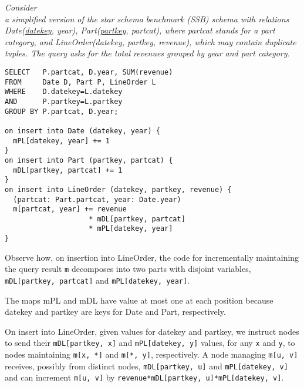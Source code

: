 \begin{example}\em
\label{ex:ssb}
Con\-sider \\ a simplified version of the star schema
benchmark (SSB) schema with relations Date(\underline{datekey}, year),
Part(\underline{partkey}, partcat), where partcat stands for a part category,
and LineOrder(datekey, partkey, revenue), which may contain duplicate tuples.
The query asks for the total revenues grouped by year and part category.

\begin{verbatim}
SELECT   P.partcat, D.year, SUM(revenue)
FROM     Date D, Part P, LineOrder L
WHERE    D.datekey=L.datekey
AND      P.partkey=L.partkey
GROUP BY P.partcat, D.year;

on insert into Date (datekey, year) {
  mPL[datekey, year] += 1
}
on insert into Part (partkey, partcat) {
  mDL[partkey, partcat] += 1
}
on insert into LineOrder (datekey, partkey, revenue) {
  (partcat: Part.partcat, year: Date.year)
  m[partcat, year] += revenue
                    * mDL[partkey, partcat]
                    * mPL[datekey, year]
}
\end{verbatim}

Observe how, on insertion into LineOrder, the code for incrementally
maintaining the query result {\tt m} decomposes into
two parts with disjoint variables, 
{\tt mDL[partkey, partcat]} and {\tt mPL[datekey, year]}.

The maps mPL and mDL have value at most
one at each position because datekey and partkey are keys for Date and Part,
respectively.

On insert into LineOrder, given values for
datekey and partkey, we instruct nodes
to send their {\tt mDL[partkey, x]} and {\tt mPL[datekey, y]} values,
for any {\tt x} and {\tt y},
to nodes maintaining {\tt m[x, *]} and {\tt m[*, y]}, respectively.
A node managing {\tt m[u, v]} receives, possibly from distinct nodes,
{\tt mDL[partkey, u]} and {\tt mPL[datekey, v]}
and can increment {\tt m[u, v]} by
{\tt revenue*mDL[partkey, u]*mPL[datekey, v]}.
%
\punto
\end{example}


